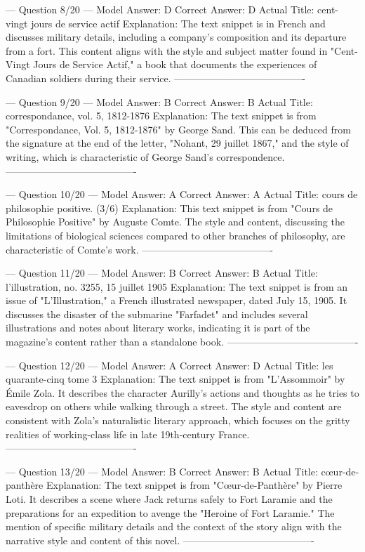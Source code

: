 \documentclass[11pt]{article}
\begin{document}
{--- Question 8/20 ---
Model Answer:    D
Correct Answer:  D
Actual Title:    cent-vingt jours de service actif
Explanation:     The text snippet is in French and discusses military details, including a company's composition and its departure from a fort. This content aligns with the style and subject matter found in "Cent-Vingt Jours de Service Actif," a book that documents the experiences of Canadian soldiers during their service.
----------------------------------------

--- Question 9/20 ---
Model Answer:    B
Correct Answer:  B
Actual Title:    correspondance, vol. 5, 1812-1876
Explanation:     The text snippet is from "Correspondance, Vol. 5, 1812-1876" by George Sand. This can be deduced from the signature at the end of the letter, "Nohant, 29 juillet 1867," and the style of writing, which is characteristic of George Sand's correspondence.
----------------------------------------

--- Question 10/20 ---
Model Answer:    A
Correct Answer:  A
Actual Title:    cours de philosophie positive. (3/6)
Explanation:     This text snippet is from "Cours de Philosophie Positive" by Auguste Comte. The style and content, discussing the limitations of biological sciences compared to other branches of philosophy, are characteristic of Comte's work.
----------------------------------------

--- Question 11/20 ---
Model Answer:    B
Correct Answer:  B
Actual Title:    l'illustration, no. 3255, 15 juillet 1905
Explanation:     The text snippet is from an issue of "L'Illustration," a French illustrated newspaper, dated July 15, 1905. It discusses the disaster of the submarine "Farfadet" and includes several illustrations and notes about literary works, indicating it is part of the magazine's content rather than a standalone book.
----------------------------------------

--- Question 12/20 ---
Model Answer:    A
Correct Answer:  D
Actual Title:    les quarante-cinq tome 3
Explanation:     The text snippet is from "L'Assommoir" by Émile Zola. It describes the character Aurilly's actions and thoughts as he tries to eavesdrop on others while walking through a street. The style and content are consistent with Zola's naturalistic literary approach, which focuses on the gritty realities of working-class life in late 19th-century France.
----------------------------------------

--- Question 13/20 ---
Model Answer:    B
Correct Answer:  B
Actual Title:    cœur-de-panthère
Explanation:     The text snippet is from "Cœur-de-Panthère" by Pierre Loti. It describes a scene where Jack returns safely to Fort Laramie and the preparations for an expedition to avenge the "Heroine of Fort Laramie." The mention of specific military details and the context of the story align with the narrative style and content of this novel.
----------------------------------------

}
\end{document}
